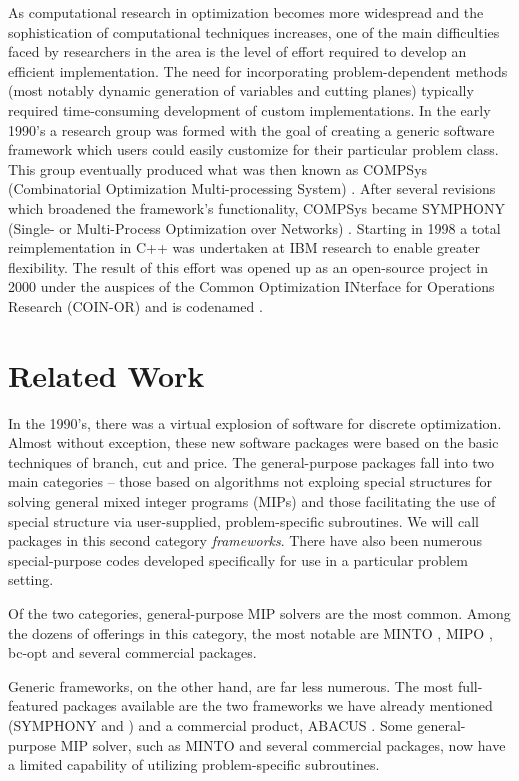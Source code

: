 As computational research in optimization becomes more widespread and
the sophistication of computational techniques increases, 
one of the main difficulties faced by researchers in the area
is the level of effort required to
develop an efficient implementation. The need for
incorporating problem-dependent methods (most notably dynamic
generation of variables and cutting planes) typically required
time-consuming development of custom implementations. In the early 1990's
a research group was formed with the goal of creating 
a generic software framework which users
could easily customize for their particular problem class. This
group eventually produced what was then known as COMPSys
(Combinatorial Optimization Multi-processing System) \cite{P:compsys}. 
After several
revisions which broadened the framework's functionality, 
COMPSys became SYMPHONY
(Single- or Multi-Process Optimization over Networks)
\cite{W:symphony}. Starting in 1998 a total reimplementation in C++ was
undertaken at IBM research to enable greater flexibility. The result of this
effort was opened up as an open-source project in 2000 under the auspices of
the Common Optimization INterface for Operations Research (COIN-OR) 
\cite{W:coin-or} and is codenamed \BB.

\section{Related Work}

In the 1990's, there was a virtual explosion of software for discrete
optimization. Almost without exception, these new software packages
were based on the basic techniques of branch, cut and price. The
general-purpose packages fall into two main
categories -- those based on algorithms not exploing special structures 
for solving general
mixed integer programs (MIPs)
and those facilitating the use of special structure via
user-supplied, problem-specific subroutines. We will call
packages in this second category {\em frameworks}. There have also been
numerous special-purpose codes developed specifically for use in a
particular problem setting. 

Of the two categories, general-purpose MIP solvers are the most common. 
Among the 
dozens of offerings in this category, the most notable are MINTO
\cite{W:minto}, MIPO \cite{W:mipo}, bc-opt \cite{W:bcopt} and 
several commercial
packages. 

Generic
frameworks, on the other hand, are far less numerous. The most full-featured
packages available are the two frameworks we have already mentioned (SYMPHONY
and \BB) and a commercial product, ABACUS \cite{W:abacus}.
Some general-purpose MIP solver, such as
MINTO \cite{W:minto} and several commercial packages, now have a limited
capability of utilizing problem-specific subroutines.

